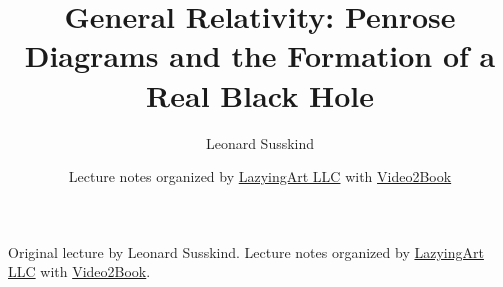 \documentclass[11pt,oneside]{book}
\begin{document}
\frontmatter
\hypersetup{pageanchor=false}
\title{General Relativity: Penrose Diagrams and the Formation of a Real Black Hole}
\author{Leonard Susskind}
\date{Lecture notes organized by \href{https://lazying.art}{LazyingArt LLC} with \href{https://github.com/lachlanchen/Video2Book}{Video2Book}}
\maketitle
\begin{center}
\small Original lecture by Leonard Susskind. Lecture notes organized by \href{https://lazying.art}{LazyingArt LLC} with \href{https://github.com/lachlanchen/Video2Book}{Video2Book}.
\end{center}
\clearpage
\hypersetup{pageanchor=true}
\mainmatter

\end{document}
